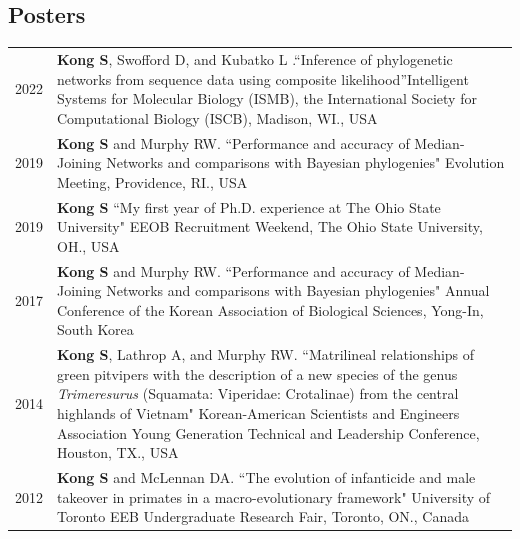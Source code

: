 \documentclass[11pt]{article}
\begin{document}
\subsection*{Posters}
\begin{longtable}{p{}  p{}}
2022 & {\color{red}{\textbf{[Best Poster Award]}}}\textbf{Kong S}, Swofford D, and Kubatko L .``Inference of phylogenetic networks from sequence data using composite likelihood''Intelligent Systems for Molecular Biology (ISMB), the International Society for Computational Biology (ISCB), Madison, WI., USA  \vspace{5pt}\\
2019 & \textbf{Kong S} and Murphy RW. ``Performance and accuracy of Median-Joining Networks and comparisons with Bayesian phylogenies" Evolution Meeting, Providence, RI., USA \vspace{5pt} \\ 
2019 &  \textbf{Kong S} ``My first year of Ph.D. experience at The Ohio State University" EEOB Recruitment Weekend,  The Ohio State University, OH., USA\vspace{5pt} \\ 
2017 & \textbf{Kong S} and Murphy RW. ``Performance and accuracy of Median-Joining Networks and comparisons with Bayesian phylogenies"  Annual Conference of the Korean Association of Biological Sciences, Yong-In, South Korea\vspace{5pt} \\ 
2014 & \textbf{Kong S}, Lathrop A, and Murphy RW. ``Matrilineal relationships of green pitvipers with the description of a new species of the genus \textit{Trimeresurus} (Squamata: Viperidae: Crotalinae) from the central highlands of Vietnam" Korean-American Scientists and Engineers Association Young Generation Technical and Leadership Conference, Houston, TX., USA\vspace{5pt} \\ 
2012 & \textbf{Kong S} and McLennan DA. ``The evolution of infanticide and male takeover in primates in a macro-evolutionary framework" University of Toronto EEB Undergraduate Research Fair, Toronto, ON., Canada\vspace{5pt}\\
\end{longtable}

\pagebreak
\end{document}
